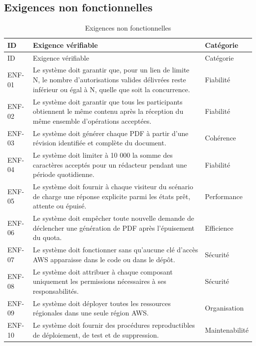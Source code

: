 \subsection{Exigences non fonctionnelles}

\begingroup\small\setlength{\tabcolsep}{3pt}\renewcommand{\arraystretch}{1.25}
\begin{longtable}{|P{0.22\textwidth}|P{0.36\textwidth}|P{0.35\textwidth}|}
\caption{Exigences non fonctionnelles}\\
\hline
ID & Exigence vérifiable & Catégorie \\ \hline
\endfirsthead
\hline
ID & Exigence vérifiable & Catégorie \\ \hline
\endhead
\endfoot

ENF-01 & Le système doit garantir que, pour un lien de limite N, le nombre d'autorisations valides délivrées reste inférieur ou égal à N, quelle que soit la concurrence. & Fiabilité \\ \hline

ENF-02 & Le système doit garantir que tous les participants obtiennent le même contenu après la réception du même ensemble d'opérations acceptées. & Fiabilité \\ \hline

ENF-03 & Le système doit générer chaque PDF à partir d'une révision identifiée et complète du document. & Cohérence \\ \hline

ENF-04 & Le système doit limiter à 10 000 la somme des caractères acceptés pour un rédacteur pendant une période quotidienne. & Fiabilité \\ \hline

ENF-05 & Le système doit fournir à chaque visiteur du scénario de charge une réponse explicite parmi les états prêt, attente ou épuisé. & Performance \\ \hline

ENF-06 & Le système doit empêcher toute nouvelle demande de déclencher une génération de PDF après l'épuisement du quota. & Efficience \\ \hline

ENF-07 & Le système doit fonctionner sans qu'aucune clé d'accès AWS apparaisse dans le code ou dans le dépôt. & Sécurité \\ \hline

ENF-08 & Le système doit attribuer à chaque composant uniquement les permissions nécessaires à ses responsabilités. & Sécurité \\ \hline

ENF-09 & Le système doit déployer toutes les ressources régionales dans une seule région AWS. & Organisation \\ \hline

ENF-10 & Le système doit fournir des procédures reproductibles de déploiement, de test et de suppression. & Maintenabilité \\ \hline

\end{longtable}\endgroup

